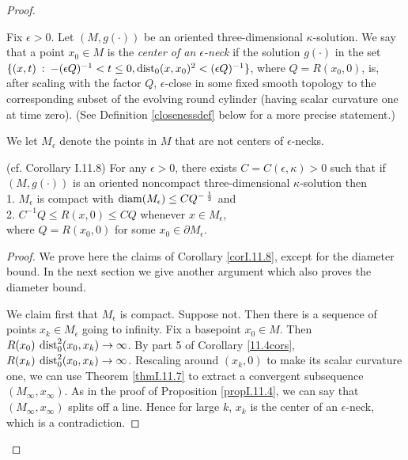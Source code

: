 \begin{proof}
\begin{definition}
Fix $\epsilon > 0$. Let $(M, g(\cdot))$ be an oriented three-dimensional $\kappa$-solution.
We say that a point $x_0 \in M$ is the {\em center of an $\epsilon$-neck} if the
solution $g(\cdot)$ in the set
$\{(x,t) \: : \: - (\epsilon Q)^{-1} < t \le 0, \operatorname{dist}_0(x, x_0)^2 < (\epsilon Q)^{-1}\}$,
where $Q = R(x_0, 0)$, is, after scaling with the factor $Q$, $\epsilon$-close
in some fixed smooth topology to the corresponding subset of the
evolving round cylinder (having scalar curvature one at time zero).
(See Definition \ref{closenessdef} below for a more precise statement.)

We let $M_\epsilon$ denote the points in $M$ that are not centers of
$\epsilon$-necks.
\end{definition}

\begin{corollary}
  \label{cor:kl-necklike-behavior-at-infinity-three-dimensional-solution-weak-version-existence-kappa-solutions}
 (cf. Corollary I.11.8) \label{corI.11.8}
For any $\epsilon > 0$, there exists $C = C(\epsilon, \kappa) > 0$ such that
if $(M, g(\cdot))$ is an oriented noncompact three-dimensional $\kappa$-solution then \\
1.  $M_\epsilon$ is compact with $\operatorname{diam}(M_\epsilon) \le C Q^{- \: \frac12}$ and \\
2. $C^{-1} Q \le R(x,0) \le CQ$ whenever $x \in M_\epsilon$, \\
where $Q = R(x_0, 0)$ for some $x_0 \in \partial M_\epsilon$.
\end{corollary}
\begin{proof}
We  prove here the claims of
Corollary \ref{corI.11.8}, except for the
diameter bound. In the next section we give another argument which
also proves the diameter bound.

We claim first that $M_\epsilon$ is compact.  Suppose not.
Then there is a sequence of points $x_k \in M_\epsilon$ going to
infinity. Fix a basepoint $x_0 \in M$. Then
$R(x_0) \: \operatorname{dist}_0^2(x_0, x_k) \rightarrow \infty$. By
part 5 of Corollary \ref{11.4cors},
$R(x_k) \: \operatorname{dist}_0^2(x_0, x_k) \rightarrow \infty$.  Rescaling
around $(x_k, 0)$ to make its scalar curvature one, we can use
Theorem \ref{thmI.11.7} to extract a convergent subsequence
$(M_\infty, x_\infty)$.
As in the proof of Proposition \ref{propI.11.4}, we can say that
$(M_\infty, x_\infty)$ splits off a line.  Hence for large $k$,
$x_k$ is the center of an $\epsilon$-neck, which is a contradiction.


\end{proof}
\end{proof}
